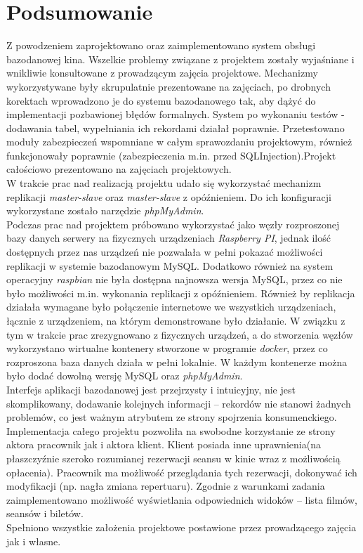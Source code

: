 \chapter{Podsumowanie}

Z powodzeniem zaprojektowano oraz zaimplementowano system obsługi bazodanowej kina.
Wszelkie problemy związane z projektem zostały wyjaśniane i wnikliwie konsultowane z prowadzącym
zajęcia projektowe. Mechanizmy wykorzystywane były skrupulatnie prezentowane na zajęciach,
po drobnych korektach wprowadzono je do systemu bazodanowego tak, aby dążyć do
implementacji pozbawionej błędów formalnych.
System po wykonaniu testów -dodawania tabel, wypełniania ich rekordami działał poprawnie.
Przetestowano moduły zabezpieczeń wspomniane w całym sprawozdaniu projektowym, również
funkcjonowały poprawnie (zabezpieczenia m.in. przed SQLInjection).Projekt całościowo prezentowano
na zajęciach projektowych.\\

W trakcie prac nad realizacją projektu udało się wykorzystać mechanizm replikacji \textit{master-slave} oraz \textit{master-slave} z opóźnieniem. Do ich konfiguracji wykorzystane zostało narzędzie \textit{phpMyAdmin}. \\

Podczas prac nad projektem próbowano wykorzystać jako węzły rozproszonej bazy danych serwery na fizycznych urządzeniach \textit{Raspberry PI}, jednak ilość dostępnych przez nas urządzeń nie pozwalała w pełni pokazać możliwości replikacji w systemie bazodanowym MySQL. Dodatkowo również na system operacyjny \textit{raspbian} nie była dostępna najnowsza wersja MySQL, przez co nie było możliwości m.in. wykonania replikacji z opóźnieniem. Również by replikacja działała wymagane było połączenie internetowe we wszystkich urządzeniach, łącznie z urządzeniem, na którym demonstrowane było działanie. W związku z tym w trakcie prac zrezygnowano z fizycznych urządzeń, a do stworzenia węzłów wykorzystano wirtualne kontenery stworzone w programie \textit{docker}, przez co rozproszona baza danych działa w pełni lokalnie. W każdym kontenerze można było dodać dowolną wersję MySQL oraz \textit{phpMyAdmin}.\\


Interfejs aplikacji bazodanowej jest przejrzysty i intuicyjny, nie jest skomplikowany, dodawanie kolejnych informacji – rekordów nie stanowi żadnych problemów, co jest ważnym atrybutem ze strony spojrzenia konsumenckiego. Implementacja całego projektu pozwoliła na swobodne korzystanie ze strony aktora pracownik jak i aktora klient. Klient posiada inne uprawnienia(na płaszczyźnie szeroko rozumianej rezerwacji seansu w kinie wraz z możliwością opłacenia). Pracownik ma możliwość przeglądania tych rezerwacji, dokonywać ich modyfikacji (np. nagła zmiana repertuaru). Zgodnie z warunkami zadania zaimplementowano możliwość wyświetlania odpowiednich widoków – lista filmów, seansów i biletów.\\

Spełniono wszystkie założenia projektowe postawione przez prowadzącego zajęcia
jak i własne.